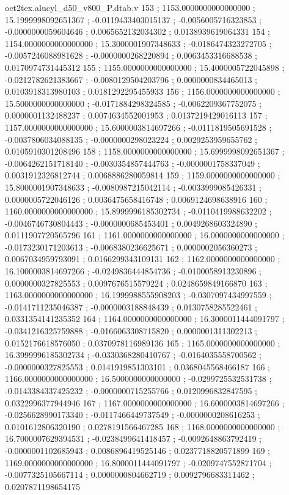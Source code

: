 \begin{filecontents}[overwrite]{oct2tex.alucyl_d50_v800_P.dtab.v}
153 ; 1153.0000000000000000 ; 15.1999998092651367 ; -0.0119433403015137 ; -0.0056005716323853 ; -0.0000000059604646 ; 0.0065652132034302 ; 0.0138939619064331
154 ; 1154.0000000000000000 ; 15.3000001907348633 ; -0.0186474323272705 ; -0.0057246088981628 ; -0.0000000268220894 ; 0.0063453316688538 ; 0.0170974731445312
155 ; 1155.0000000000000000 ; 15.4000005722045898 ; -0.0212782621383667 ; -0.0080129504203796 ; 0.0000000834465013 ; 0.0103918313980103 ; 0.0181292295455933
156 ; 1156.0000000000000000 ; 15.5000000000000000 ; -0.0171884298324585 ; -0.0062209367752075 ; 0.0000001132488237 ; 0.0074634552001953 ; 0.0137219429016113
157 ; 1157.0000000000000000 ; 15.6000003814697266 ; -0.0111819505691528 ; -0.0037806034088135 ; -0.0000000298023224 ; 0.0029253959655762 ; 0.0105910301208496
158 ; 1158.0000000000000000 ; 15.6999998092651367 ; -0.0064262151718140 ; -0.0030354857444763 ; -0.0000001758337049 ; 0.0031912326812744 ; 0.0068886280059814
159 ; 1159.0000000000000000 ; 15.8000001907348633 ; -0.0080987215042114 ; -0.0033999085426331 ; 0.0000005722046126 ; 0.0036475658416748 ; 0.0069124698638916
160 ; 1160.0000000000000000 ; 15.8999996185302734 ; -0.0110419988632202 ; -0.0046746730804443 ; -0.0000000685453401 ; 0.0049268603324890 ; 0.0111907720565796
161 ; 1161.0000000000000000 ; 16.0000000000000000 ; -0.0173230171203613 ; -0.0068380236625671 ; 0.0000002056360273 ; 0.0067034959793091 ; 0.0166299343109131
162 ; 1162.0000000000000000 ; 16.1000003814697266 ; -0.0249836444854736 ; -0.0100058913230896 ; 0.0000000327825553 ; 0.0097676515579224 ; 0.0248659849166870
163 ; 1163.0000000000000000 ; 16.1999988555908203 ; -0.0307097434997559 ; -0.0141711235046387 ; -0.0000003188848439 ; 0.0130758285522461 ; 0.0331354141235352
164 ; 1164.0000000000000000 ; 16.3000011444091797 ; -0.0341216325759888 ; -0.0166063308715820 ; 0.0000001311302213 ; 0.0152176618576050 ; 0.0370978116989136
165 ; 1165.0000000000000000 ; 16.3999996185302734 ; -0.0330368280410767 ; -0.0164035558700562 ; -0.0000000327825553 ; 0.0141919851303101 ; 0.0368045568466187
166 ; 1166.0000000000000000 ; 16.5000000000000000 ; -0.0299725532531738 ; -0.0143384337425232 ; -0.0000000715255766 ; 0.0120996832847595 ; 0.0322996377944946
167 ; 1167.0000000000000000 ; 16.6000003814697266 ; -0.0256628990173340 ; -0.0117466449737549 ; -0.0000000208616253 ; 0.0101612806320190 ; 0.0278191566467285
168 ; 1168.0000000000000000 ; 16.7000007629394531 ; -0.0238499641418457 ; -0.0092648863792419 ; -0.0000001102685943 ; 0.0086896419525146 ; 0.0237718820571899
169 ; 1169.0000000000000000 ; 16.8000011444091797 ; -0.0209747552871704 ; -0.0077325105667114 ; 0.0000000804662719 ; 0.0092796683311462 ; 0.0207871198654175

\end{filecontents}
